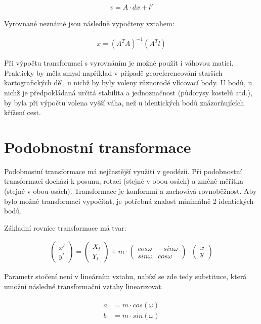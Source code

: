 \documentclass[thesis=M,czech]{FITthesis}[2012/06/26]
\begin{document}
\begin{align}\label{opravy}
v = A \cdot dx + l'
\end{align}

Vyrovnané neznámé jsou následně vypočteny vztahem:

\begin{align}\label{mnc}
x = (A^TA)^{-1}(A^Tl)
\end{align}

Při výpočtu transformací s vyrovnáním je možné použít i váhovou matici. Prakticky by měla smysl například v případě georeferencování starších kartografických děl, u nichž by byly voleny různorodé vlícovací body. U bodů, u nichž je předpokládaná určitá stabilita a jednoznačnost (půdorysy kostelů atd.), by byla při výpočtu volena vyšší váha, než u identických bodů znázorňujících křížení cest. 



\section{Podobnostní transformace}
Podobnostní transformace má nejčastější využití v geodézii. Při podobnostní transformaci dochází k posunu, rotaci (stejné v obou osách) a změně měřítka (stejné v obou osách). Transformace je konformní a zachovává rovnoběžnost. Aby bylo možné transformaci vypočítat, je potřebná znalost minimálně 2 identických bodů. 

Základní rovnice transformace má tvar:

\begin{align} \label{podob}
\begin{pmatrix}
x'\\ 
y'
\end{pmatrix} = 
\begin{pmatrix}
X_t\\ 
Y_t
\end{pmatrix} +
m\cdot \begin{pmatrix}
cos\omega  & -sin\omega\\ 
sin\omega & cos\omega
\end{pmatrix}\cdot 
\begin{pmatrix}
x\\ 
y
\end{pmatrix}
\end{align}

Parametr stočení není v lineárním vztahu, nabízí se zde tedy substituce, která umožní následné transformační vztahy linearizovat.

\begin{align}  \label{podobn} 
\begin{split}
a &= m \cdot cos(\omega) \\
b &= m \cdot sin(\omega) 
\end{split}
\end{align}
\end{document}
